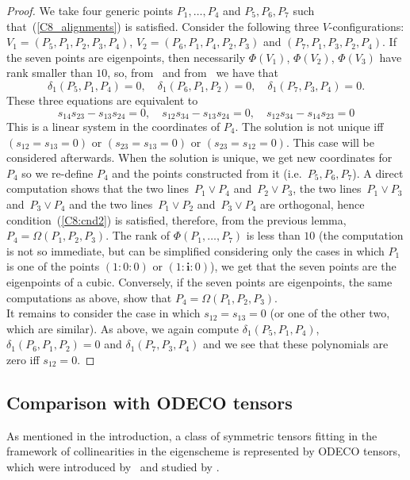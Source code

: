 \documentclass{amsart}
\theoremstyle{plain}
\theoremstyle{definition}
\newcommand{\iii}{\textbf{i}}
\begin{document}
\begin{proof}
We take four generic points
$P_1, \dots, P_4$ and $P_5, P_6, P_7$ such that~(\ref{C8_alignments})
is satisfied. Consider the following three $V$-configurations:
$V_1 = (P_5, P_1, P_2, P_3, P_4)$, $V_2 = (P_6, P_1, P_4, P_2, P_3)$
and $(P_7, P_1, P_3, P_2, P_4)$. If the seven points are eigenpoints,
then necessarily $\Phi(V_1)$, $\Phi(V_2)$, $\Phi(V_3)$ have rank
smaller than $10$, so, from~ and
from~
we have that
%
\[
  \delta_1(P_5, P_1, P_4) = 0, \quad
  \delta_1(P_6, P_1, P_2) = 0, \quad
  \delta_1(P_7, P_3, P_4) = 0.
\]
%
These three equations are equivalent to
%
\[
  s_{14}s_{23}-s_{13}s_{24} = 0, \quad
  s_{12}s_{34}-s_{13}s_{24} = 0, \quad
  s_{12}s_{34}-s_{14}s_{23} = 0
\]
%
This is a linear system in the coordinates of $P_4$. The solution is
not unique iff $(s_{12} = s_{13} = 0)$ or $(s_{23} = s_{13} = 0)$
or $(s_{23} = s_{12} = 0)$. This case will be considered afterwards.
When the solution is unique, we get new coordinates for $P_4$ so we
re-define $P_4$ and the points constructed from it (i.e.\ $P_5, P_6, P_7$).
A direct computation shows that the two lines~$P_1 \vee P_4$ and~$P_2 \vee P_3$,
the two lines~$P_1 \vee P_3$ and~$P_3 \vee P_4$ and the two lines~$P_1 \vee P_2$ and~$P_3 \vee P_4$
are orthogonal, hence condition~(\ref{C8:cnd2}) is satisfied,
therefore, from the
previous lemma, $P_4 = \Omega(P_1, P_2, P_3)$. The rank
of $\Phi(P_1, \dotsc, P_7)$ is less than $10$ (the computation is
not so immediate, but can be simplified considering only the
cases in which $P_1$ is one of the points $(1: 0: 0)$ or
$(1: \iii: 0)$), we get that the seven points
are the eigenpoints of a cubic. Conversely, if the seven points are
eigenpoints, the same computations as above, show that
$P_4 = \Omega(P_1, P_2, P_3)$.\\
It remains to consider the case in which $s_{12} = s_{13} = 0$ (or one of
the other two, which are similar). As above, we again compute
$\delta_1(P_5, P_1, P_4)$, $\delta_1(P_6, P_1, P_2) = 0$ and
$\delta_1(P_7, P_3, P_4)$ and we see that these polynomials are zero
iff $s_{12} = 0$.
\end{proof}

\subsection{Comparison with ODECO tensors}
As mentioned in the introduction, a class of
symmetric tensors fitting in the framework of collinearities in the eigenscheme is represented by ODECO tensors, which were introduced by~\cite{Rob} and studied by \cite{BDHE, Koiran2021, Biaggi2022}.
\end{document}
